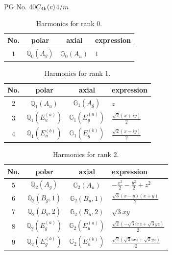\documentclass[fleqn,8pt,landscape]{jsarticle}
\begin{document}
\setcounter{MaxMatrixCols}{32}

\renewcommand{\tablename}{Table~}
\renewcommand{\figurename}{Figure~}
\begin{center}
\LARGE
PG No. 40\quad$C_{\rm 4h}(c)$\quad$4/m$\quad[ tetragonal ]
\end{center}
\begin{table}[ht!]
\begin{center}
\caption{Harmonics for rank 0.}
\renewcommand{\arraystretch}{1.3}
\begin{tabular}{cccl} \hline \hline
No. & polar & axial & expression \\ \hline
$ 1 $ & $ \mathbb{Q}_{0}(A_{g}) $ & $ \mathbb{G}_{0}(A_{u}) $ & $ 1 $ \\
 \hline \hline
\end{tabular}
\end{center}
\end{table}
\begin{table}[ht!]
\begin{center}
\caption{Harmonics for rank 1.}
\renewcommand{\arraystretch}{1.3}
\begin{tabular}{cccl} \hline \hline
No. & polar & axial & expression \\ \hline
$ 2 $ & $ \mathbb{Q}_{1}(A_{u}) $ & $ \mathbb{G}_{1}(A_{g}) $ & $ z $ \\
$ 3 $ & $ \mathbb{Q}_{1}(E_{u}^{(a)}) $ & $ \mathbb{G}_{1}(E_{g}^{(a)}) $ & $ \frac{\sqrt{2} \left(x + i y\right)}{2} $ \\
$ 4 $ & $ \mathbb{Q}_{1}(E_{u}^{(b)}) $ & $ \mathbb{G}_{1}(E_{g}^{(b)}) $ & $ \frac{\sqrt{2} \left(x - i y\right)}{2} $ \\
 \hline \hline
\end{tabular}
\end{center}
\end{table}
\begin{table}[ht!]
\begin{center}
\caption{Harmonics for rank 2.}
\renewcommand{\arraystretch}{1.3}
\begin{tabular}{cccl} \hline \hline
No. & polar & axial & expression \\ \hline
$ 5 $ & $ \mathbb{Q}_{2}(A_{g}) $ & $ \mathbb{G}_{2}(A_{u}) $ & $ - \frac{x^{2}}{2} - \frac{y^{2}}{2} + z^{2} $ \\
$ 6 $ & $ \mathbb{Q}_{2}(B_{g},1) $ & $ \mathbb{G}_{2}(B_{u},1) $ & $ \frac{\sqrt{3} \left(x - y\right) \left(x + y\right)}{2} $ \\
$ 7 $ & $ \mathbb{Q}_{2}(B_{g},2) $ & $ \mathbb{G}_{2}(B_{u},2) $ & $ \sqrt{3} x y $ \\
$ 8 $ & $ \mathbb{Q}_{2}(E_{g}^{(a)}) $ & $ \mathbb{G}_{2}(E_{u}^{(a)}) $ & $ \frac{\sqrt{2} \left(- \sqrt{3} i x z + \sqrt{3} y z\right)}{2} $ \\
$ 9 $ & $ \mathbb{Q}_{2}(E_{g}^{(b)}) $ & $ \mathbb{G}_{2}(E_{u}^{(b)}) $ & $ \frac{\sqrt{2} \left(\sqrt{3} i x z + \sqrt{3} y z\right)}{2} $ \\
 \hline \hline
\end{tabular}
\end{center}
\end{table}
\end{document}
